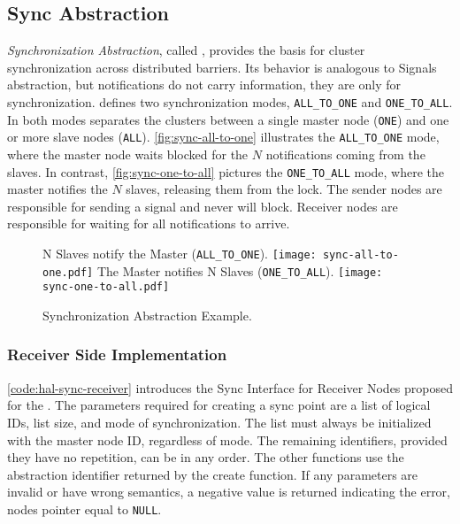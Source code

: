 
		\subsection{Sync Abstraction}
		\label{sec.sync-abs}

			\textit{Synchronization Abstraction}, called \sync, provides the
			basis for cluster synchronization across distributed barriers.
			Its behavior is analogous to \posix Signals abstraction, but
			notifications do not carry information, they are only for synchronization.
			\sync defines two synchronization modes, \texttt{ALL\_TO\_ONE} and
			\texttt{ONE\_TO\_ALL}. In both modes separates the clusters between
			a single master node (\texttt{ONE}) and one or more slave nodes
			(\texttt{ALL}). \autoref{fig:sync-all-to-one} illustrates the
			\texttt{ALL\_TO\_ONE} mode, where the master node waits blocked for
			the $N$ notifications coming from the slaves. In contrast,
			\autoref{fig:sync-one-to-all} pictures the \texttt{ONE\_TO\_ALL} mode,
			where the master notifies the $N$ slaves, releasing them from the lock.
			The sender nodes are responsible for sending a signal and never will
			block. Receiver nodes are responsible for waiting for all notifications
			to arrive.

			\begin{figure}[!tb]
				\centering%
				\caption{Synchronization Abstraction Example.}%
				\label{fig:sync-concepts}%

					{N Slaves notify the Master (\texttt{ALL\_TO\_ONE}).}%
					{\texttt{[image: sync-all-to-one.pdf]}}%
				\hspace{1cm}%
					{The Master notifies N Slaves (\texttt{ONE\_TO\_ALL}).}%
					{\texttt{[image: sync-one-to-all.pdf]}}%

			\end{figure}

			\subsubsection{Receiver Side Implementation}

				\autoref{code:hal-sync-receiver} introduces the Sync Interface for
				Receiver Nodes proposed for the \nanvix \hal. The parameters required
				for creating a sync point are a list of logical IDs, list size,
				and mode of synchronization. The list must always be initialized
				with the master node ID, regardless of mode. The remaining identifiers,
				provided they have no repetition, can be in any order. The other
				functions use the abstraction identifier returned by the create
				function. If any parameters are invalid or have wrong
				semantics, a
				negative value is returned indicating the error, \eg nodes pointer
				equal to \texttt{NULL}.

